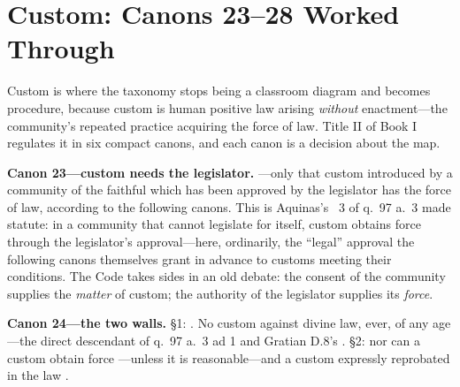 \section{Custom: Canons 23--28 Worked Through}

Custom is where the taxonomy stops being a classroom diagram and becomes procedure, because custom is human positive law arising \emph{without} enactment---the community's repeated practice acquiring the force of law. Title II of Book I regulates it in six compact canons, and each canon is a decision about the map.

\textbf{Canon 23---custom needs the legislator.} ---only that custom introduced by a community of the faithful which has been approved by the legislator has the force of law, according to the following canons. This is Aquinas's ~3 of q.~97 a.~3 made statute: in a community that cannot legislate for itself, custom obtains force through the legislator's approval---here, ordinarily, the ``legal'' approval the following canons themselves grant in advance to customs meeting their conditions. The Code takes sides in an old debate: the consent of the community supplies the \emph{matter} of custom; the authority of the legislator supplies its \emph{force}.

\textbf{Canon 24---the two walls.} §1: . No custom against divine law, ever, of any age---the direct descendant of q.~97 a.~3 ad 1 and Gratian D.8's . §2: nor can a custom  obtain force ---unless it is reasonable---and a custom expressly reprobated in the law .

